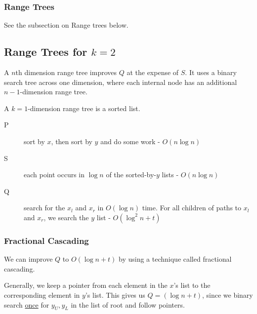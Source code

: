                     \subsubsection{Range Trees} %
                    \label{ssub:range_trees}
                        See the subsection on Range trees below.
                \subsection{Range Trees for $k=2$} %
                \label{sub:range_trees_for_k_2}
                    A $n$th dimension range tree improves $Q$ at the expense of $S$.
                    It uses a binary search tree across one dimension, where each internal node has an additional $n-1$-dimension range tree.

                    A $k=1$-dimension range tree is a sorted list.

                    \begin{description}
                        \item[P] sort by $x$, then sort by $y$ and do some work - $O(n \log n)$
                        \item[S] each point occurs in $\log n$ of the sorted-by-$y$ lists - $O(n \log n)$
                        \item[Q] search for the $x_l$ and $x_r$ in $O(\log n)$ time. For all children of paths to $x_l$ and $x_r$, we search the $y$ list - $O(\log^2 n + t)$
                    \end{description}

                    \subsubsection{Fractional Cascading} %
                    \label{ssub:fractional_cascading}
                        We can improve $Q$ to $O(\log n + t)$ by using a technique called fractional cascading.

                        Generally, we keep a pointer from each element in the $x$'s list to the corresponding element in $y$'s list.
                        This gives us $Q = (\log n + t)$, since we binary search \uline{once} for $y_U, y_L$ in the list of root and follow pointers.

